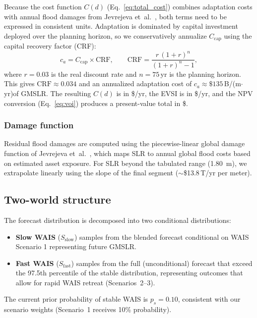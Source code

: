 \documentclass[12pt]{article}
\begin{document}
Because the cost function $C(d)$ (Eq.~\ref{eq:total_cost}) combines adaptation costs with annual flood damages from Jevrejeva et~al.~\citep{Jevrejeva2018}, both terms need to be expressed in consistent units. Adaptation is dominated by capital investment deployed over the planning horizon, so we conservatively annualize $C_{\mathrm{cap}}$ using the capital recovery factor (CRF):
\begin{equation}
c_a = C_{\mathrm{cap}} \times \mathrm{CRF}, \qquad \mathrm{CRF} = \frac{r\,(1+r)^n}{(1+r)^n - 1},
\label{eq:crf}
\end{equation}
where $r = 0.03$ is the real discount rate and $n = 75$\,yr is the planning horizon. This gives $\mathrm{CRF} \approx 0.034$ and an annualized adaptation cost of $c_a \approx \$135$\,B/(m$\cdot$yr)of GMSLR. The resulting $C(d)$ is in \$/yr, the EVSI is in \$/yr, and the NPV conversion (Eq.~\ref{eq:voi}) produces a present-value total in \$.

\subsubsection{Damage function}

Residual flood damages are computed using the piecewise-linear global damage function of Jevrejeva et~al.~\citep{Jevrejeva2018}, which maps SLR to annual global flood costs based on estimated asset exposure. For SLR beyond the tabulated range (1.80~m), we extrapolate linearly using the slope of the final segment ($\sim$\$13.8\,T/yr per meter).

\subsection{Two-world structure}

The forecast distribution is decomposed into two conditional distributions:
\begin{itemize}
\item \textbf{Slow WAIS} ($S_{\mathrm{slow}}$) samples from the blended forecast conditional on WAIS Scenario 1 representing future GMSLR. 
\item \textbf{Fast WAIS} ($S_{\mathrm{fast}}$) samples from the full (unconditional) forecast that exceed the 97.5th percentile of the stable distribution, representing outcomes that allow for rapid WAIS retreat (Scenarios~2--3).
\end{itemize}

The current prior probability of stable WAIS is $p_s = 0.10$, consistent with our scenario weights (Scenario~1 receives 10\% probability).
\end{document}
